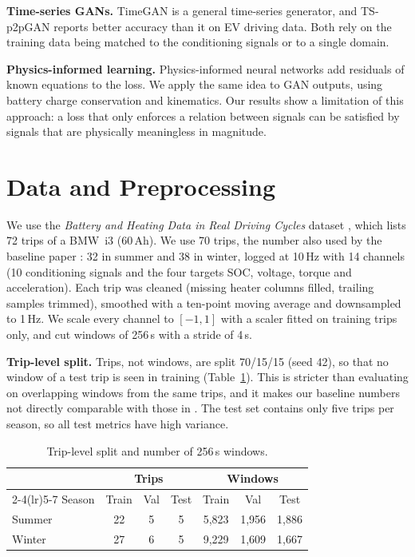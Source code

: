\documentclass[conference]{IEEEtran}
\begin{document}
\textbf{Time-series GANs.} TimeGAN \cite{yoon2019timegan} is a general time-series generator, and TS-p2pGAN \cite{jeng2025} reports better accuracy than it on EV driving data. Both rely on the training data being matched to the conditioning signals or to a single domain.

\textbf{Physics-informed learning.} Physics-informed neural networks \cite{raissi2019pinn} add residuals of known equations to the loss. We apply the same idea to GAN outputs, using battery charge conservation and kinematics. Our results show a limitation of this approach: a loss that only enforces a relation between signals can be satisfied by signals that are physically meaningless in magnitude.

\section{Data and Preprocessing}
We use the \emph{Battery and Heating Data in Real Driving Cycles} dataset \cite{ieeedata}, which lists 72 trips of a BMW~i3 (60\,Ah). We use 70 trips, the number also used by the baseline paper \cite{jeng2025}: 32 in summer and 38 in winter, logged at 10\,Hz with 14 channels (10 conditioning signals and the four targets SOC, voltage, torque and acceleration). Each trip was cleaned (missing heater columns filled, trailing samples trimmed), smoothed with a ten-point moving average and downsampled to 1\,Hz. We scale every channel to $[-1,1]$ with a scaler fitted on training trips only, and cut windows of 256\,s with a stride of 4\,s.

\textbf{Trip-level split.} Trips, not windows, are split 70/15/15 (seed 42), so that no window of a test trip is seen in training (Table~\ref{tab:split}). This is stricter than evaluating on overlapping windows from the same trips, and it makes our baseline numbers not directly comparable with those in \cite{jeng2025}. The test set contains only five trips per season, so all test metrics have high variance.

\begin{table}[t]
\caption{Trip-level split and number of 256\,s windows.}
\label{tab:split}
\centering\small
\setlength{\tabcolsep}{3.5pt}
\begin{tabular}{lcccccc}
\toprule
 & \multicolumn{3}{c}{Trips} & \multicolumn{3}{c}{Windows}\\
\cmidrule(lr){2-4}\cmidrule(lr){5-7}
Season & Train & Val & Test & Train & Val & Test\\
\midrule
Summer & 22 & 5 & 5 & 5,823 & 1,956 & 1,886\\
Winter & 27 & 6 & 5 & 9,229 & 1,609 & 1,667\\
\bottomrule
\end{tabular}
\end{table}
\end{document}
